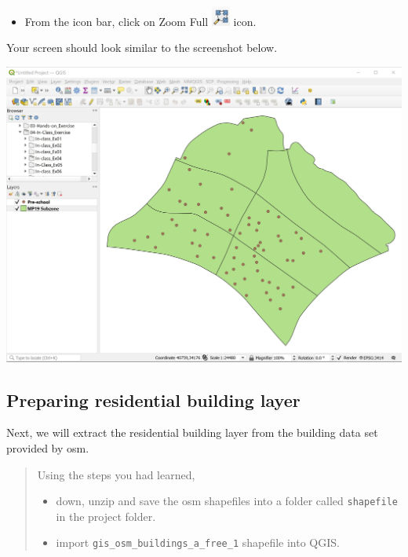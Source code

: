 \documentclass[
  letterpaper,
  DIV=11,
  numbers=noendperiod]{scrreprt}
\providecommand{\tightlist}{%
  \setlength{\itemsep}{0pt}\setlength{\parskip}{0pt}}\usepackage{longtable,booktabs,array}
\begin{document}
\begin{itemize}
\tightlist
\item
  From the icon bar, click on Zoom Full
  \includegraphics[width=0.23958in,height=\textheight]{./img04/image96.jpg}
  icon.
\end{itemize}

Your screen should look similar to the screenshot below.

\includegraphics{./img04/image97.jpg}

\hypertarget{preparing-residential-building-layer}{%
\subsection{Preparing residential building
layer}\label{preparing-residential-building-layer}}

Next, we will extract the residential building layer from the building
data set provided by osm.

\begin{quote}
Using the steps you had learned,

\begin{itemize}
\item
  down, unzip and save the osm shapefiles into a folder called
  \texttt{shapefile} in the project folder.
\item
  import \texttt{gis\_osm\_buildings\_a\_free\_1} shapefile into QGIS.
\end{itemize}
\end{quote}
\end{document}
